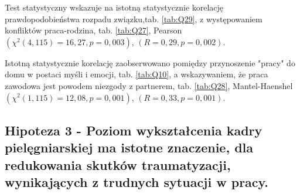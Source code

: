 \documentclass[a4paper,12pt,twoside,openright]{mwrep}
\begin{document}
	Test statystyczny wskazuje na istotną statystycznie korelację prawdopodobieństwa rozpadu związku,tab. \ref{tab:Q29}, z występowaniem konfliktów praca-rodzina, tab. \ref{tab:Q27}, Pearson $(\chi^2 (4, 115) = 16,27, p=0,003)$, $(R = 0,29, p = 0,002)$.
	
	
	
	
	Istotną statystycznie korelację zaobserwowano pomiędzy przynoszenie "pracy" do domu w postaci myśli i emocji, tab. \ref{tab:Q10}, a wskazywaniem, że praca zawodowa jest powodem niezgody z partnerem, tab. \ref{tab:Q28}, Mantel-Haenshel $(\chi^2 (1, 115) = 12,08, p=0,001)$, $(R = 0,33, p = 0,001)$.




%

%



\subsection*{Hipoteza 3 - Poziom wykształcenia kadry pielęgniarskiej ma istotne znaczenie, dla redukowania skutków traumatyzacji, wynikających z trudnych sytuacji w pracy.}


\end{document}
